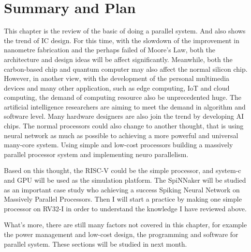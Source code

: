 \section{Summary and Plan}
\par This chapter is the review of the basic of doing a parallel system. And also shows the trend of IC design. For this time, with the slowdown of the improvement in nanometre fabrication and the perhaps failed of Moore's Law, both the architecture and design ideas will be affect significantly. Meanwhile, both the carbon-based chip and quantum computer may also affect the normal silicon chip. However, in another view, with the development of the personal multimedia devices and many other application, such as edge computing, IoT and cloud computing, the demand of computing resource also be unprecedented huge. The artificial intelligence researchers are aiming to meet the demand in algorithm and software level. Many hardware designers are also join the trend by developing AI chips. The normal processors could also change to another thought, that is using neural network as much as possible to achieving a more powerful and universal many-core system. Using simple and low-cost processors building a massively parallel processor system and implementing neuro parallelism.
\par Based on this thought, the RISC-V could be the simple processor, and system-c and GPU will be used as the simulation platform. The SpiNNaker will be studied as an important case study who achieving a success Spiking Neural Network on Massively Parallel Processors. Then I will start a practice by making one simple processor on RV32-I in order to understand the knowledge I have reviewed above.
\par What's more, there are still many factors not covered in this chapter, for example the power management and low-cost design, the programming and software for parallel system. These sections will be studied in next month.
